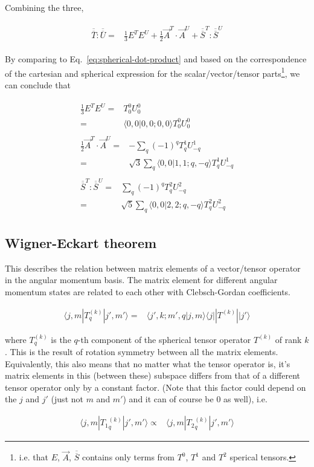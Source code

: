 \documentclass[10pt,fleqn]{article}
\newcommand{\eqar}[1]
{
  \begin{align}
    #1
  \end{align}
}
\begin{document}
Combining the three,
\eqar{
  \begin{split}
    \overline{\overline{T}}:\overline{\overline{U}}=&\frac13E^{T}E^{U}+\frac12\vec A^{T}\cdot\vec A^{U}+\overline{\overline{S}}^{T}:\overline{\overline{S}}^{U}
  \end{split}
}
By comparing to Eq.~\ref{eq:spherical-dot-product} and based on the correspondence
of the cartesian and spherical expression for the scalar/vector/tensor parts\footnote{i.e. that $E$, $\vec A$, $\overline{\overline{S}}$ contains only terms from
$T^0$, $T^1$ and $T^2$ sperical tensors.}, we can conclude that
\eqar{
  \begin{split}
    \frac13E^{T}E^{U}=&T^0_0U^0_0\\
    =&\langle 0,0|0,0;0,0\rangle T^0_0U^0_{0}
  \end{split}\\
  \begin{split}
    \frac12\vec A^{T}\cdot\vec A^{U}=&-\sum_{q}(-1)^{q}T^1_qU^1_{-q}\\
    =&\sqrt{3}\sum_{q}\langle 0,0|1,1;q,-q\rangle T^1_qU^1_{-q}
  \end{split}\\
  \begin{split}
    \overline{\overline{S}}^{T}:\overline{\overline{S}}^{U}=&\sum_{q}(-1)^{q}T^2_qU^2_{-q}\\
    =&\sqrt{5}\sum_{q}\langle 0,0|2,2;q,-q\rangle T^2_qU^2_{-q}
  \end{split}
}

\subsection{Wigner-Eckart theorem}
This describes the relation between matrix elements of a vector/tensor operator
in the angular momentum basis.
The matrix element for different angular momentum states are related to each other
with Clebsch-Gordan coefficients.
\eqar{
  \langle j,m|T_q^{(k)}|j',m' \rangle=&\langle j',k;m',q|j,m\rangle\langle j||T^{(k)}||j'\rangle
}
where $T_q^{(k)}$ is the $q$-th component of
the spherical tensor operator $T^{(k)}$ of rank $k$.
This is the result of rotation symmetry between all the matrix elements.\\

Equivalently, this also means that no matter what the tensor operator is,
it's matrix elements in this (between these) subspace
differs from that of a different tensor operator only by a constant factor.
(Note that this factor could depend on the $j$ and $j'$ (just not $m$ and $m'$)
and it can of course be $0$ as well), i.e.
\eqar{
  \langle j,m|{T_1}_q^{(k)}|j',m'\rangle\propto&\langle j,m|{T_2}_q^{(k)}|j',m'\rangle
}
\end{document}
